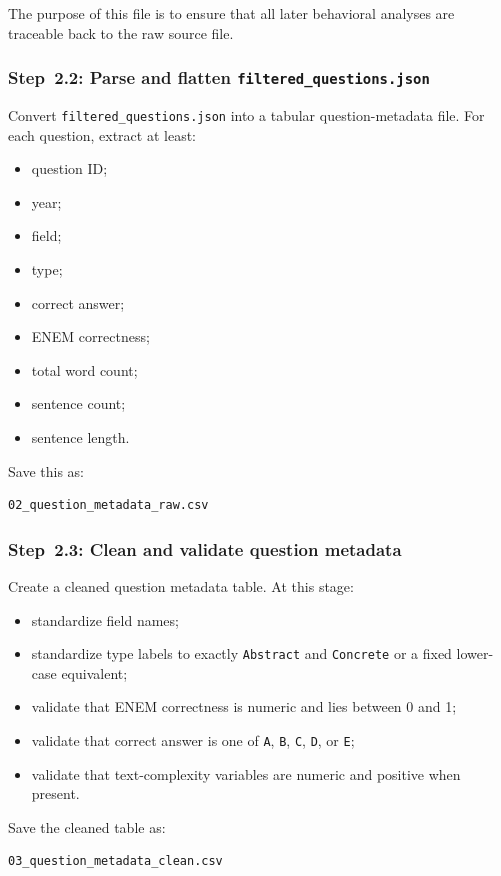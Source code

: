 The purpose of this file is to ensure that all later behavioral analyses are traceable back to the raw source file.

\subsubsection{Step~2.2: Parse and flatten \texttt{filtered\_questions.json}}
Convert \texttt{filtered\_questions.json} into a tabular question-metadata file.
For each question, extract at least:
\begin{itemize}
    \item question ID;
    \item year;
    \item field;
    \item type;
    \item correct answer;
    \item ENEM correctness;
    \item total word count;
    \item sentence count;
    \item sentence length.
\end{itemize}

Save this as:
\begin{verbatim}
02_question_metadata_raw.csv
\end{verbatim}

\subsubsection{Step~2.3: Clean and validate question metadata}
Create a cleaned question metadata table.
At this stage:
\begin{itemize}
    \item standardize field names;
    \item standardize type labels to exactly \texttt{Abstract} and \texttt{Concrete} or a fixed lower-case equivalent;
    \item validate that ENEM correctness is numeric and lies between 0 and 1;
    \item validate that correct answer is one of \texttt{A}, \texttt{B}, \texttt{C}, \texttt{D}, or \texttt{E};
    \item validate that text-complexity variables are numeric and positive when present.
\end{itemize}

Save the cleaned table as:
\begin{verbatim}
03_question_metadata_clean.csv
\end{verbatim}

